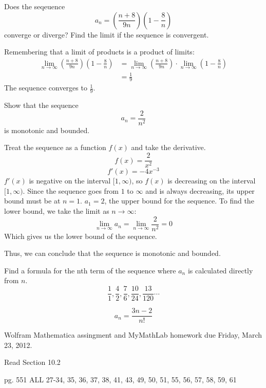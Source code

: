 \begin{ex}
  Does the seqeuence
  \[ a_n = \left( \frac{n+8}{9n} \right) \left( 1-\frac{8}{n} \right) \]
  converge or diverge? Find the limit if the sequence is convergent.
  \begin{sol}
    Remembering that a limit of products is a product of limits:
    \begin{align*}
      \lim_{n \to \infty} \left( \frac{n+8}{9n} \right) \left( 1-\frac{8}{n} \right)
      &= \lim_{n \to \infty} \left( \frac{n+8}{9n} \right) \cdot
      \lim_{n \to \infty} \left( 1-\frac{8}{n} \right)\\
      &= \frac{1}{9}
    \end{align*}
    The sequence converges to \(\frac{1}{9} \).
  \end{sol}
\end{ex}
\begin{ex}
  Show that the sequence \[a_n = \frac{2}{n^2} \] is monotonic and bounded.
  \begin{sol}
    Treat the sequence as a function $f(x)$ and take the derivative.
    \[ f(x) = \frac{2}{x^2} \]
    \[ f'(x) = -4 x^{-3} \]
    $f'(x)$ is negative on the interval $[1, \infty)$, so $f(x)$ is decreasing
      on the interval $[1, \infty)$. Since the sequence goes from $1$ to
        $\infty$ and is always decreasing, its upper bound must be at $n=1$.
        $a_1=2$, the upper bound for the sequence. To find the lower bound, we
        take the limit as $n \to \infty$:
        \[ \lim_{n \to \infty} a_n = \lim_{n \to \infty} \frac{2}{n^2} = 0 \]
        Which gives us the lower bound of the sequence.

        Thus, we can conclude that the sequence is monotonic and bounded.
  \end{sol}
\end{ex}
\begin{ex}
  Find a formula for the nth term of the sequence where \(a_n\) is calculated
  directly from \(n\).
  \[ \frac{1}{1}, \frac{4}{2}, \frac{7}{6}, \frac{10}{24}, \frac{13}{120} \cdots
    \]
  \begin{sol}
    \[ a_n = \frac{3n-2}{n!}\]
  \end{sol}
\end{ex}

\begin{homework}
    Wolfram Mathematica assingment and MyMathLab homework due Friday, March 23, 2012.
\end{homework}
\begin{homework}
  Read Section 10.2

  pg. 551 ALL 27-34, 35, 36, 37, 38, 41, 43, 49, 50, 51, 55, 56, 57, 58, 59, 61
\end{homework}

